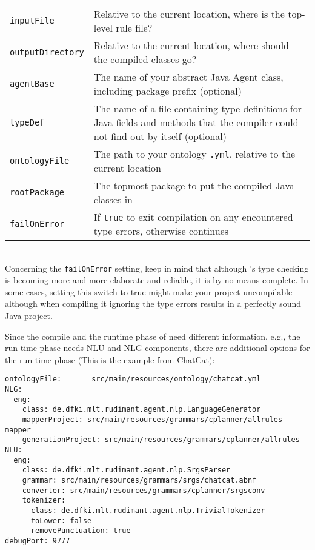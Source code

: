 \begin{tabular}{lp{}}
\texttt{inputFile}& Relative to the current location, where is the
                    top-level rule file?\\
\texttt{outputDirectory}& Relative to the current location, where
                          should the compiled classes go?\\
\texttt{agentBase}& The name of your abstract Java Agent class,
                    including package prefix (optional)\\
\texttt{typeDef}& The name of a file containing type definitions
                    for Java fields and methods that the compiler
                    could not find out by itself (optional)\\
\texttt{ontologyFile}&The path to your ontology \texttt{.yml},
                       relative to the current location\\
\texttt{rootPackage}&The topmost package to put the compiled Java
                      classes in\\
\texttt{failOnError}&If \texttt{true} to exit compilation on any
                       encountered type errors, otherwise continues\\
\end{tabular}\\

Concerning the \texttt{failOnError} setting, keep in mind that
although \vonda's type checking is becoming more and more elaborate
and reliable, it is by no means complete. In some cases, setting this
switch to true might make your project uncompilable although when
compiling it ignoring the type errors results in a perfectly sound
Java project.

Since the compile and the runtime phase of \vonda need different information,
e.g., the run-time phase needs NLU and NLG components, there are additional
options for the run-time phase (This is the example from ChatCat):
\newpage
\begin{verbatim}
ontologyFile:       src/main/resources/ontology/chatcat.yml
NLG:
  eng:
    class: de.dfki.mlt.rudimant.agent.nlp.LanguageGenerator
    mapperProject: src/main/resources/grammars/cplanner/allrules-mapper
    generationProject: src/main/resources/grammars/cplanner/allrules
NLU:
  eng:
    class: de.dfki.mlt.rudimant.agent.nlp.SrgsParser
    grammar: src/main/resources/grammars/srgs/chatcat.abnf
    converter: src/main/resources/grammars/cplanner/srgsconv
    tokenizer:
      class: de.dfki.mlt.rudimant.agent.nlp.TrivialTokenizer
      toLower: false
      removePunctuation: true
debugPort: 9777
\end{verbatim}

